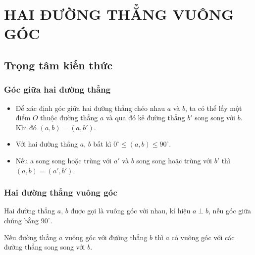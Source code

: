 \setcounter{section}{21}
\setcounter{dang}{0}
\section{HAI ĐƯỜNG THẲNG VUÔNG GÓC}
\subsection{Trọng tâm kiến thức}
\begin{tomtat}
	\subsubsection{Góc giữa hai đường thẳng}
	\begin{boxdn}
	\end{boxdn}
	\begin{note}
	\begin{itemize}
	\item Để xác định góc giữa hai đường thẳng chéo nhau $a$ và $b$, ta có thể lấy một điểm $O$ thuộc đường thẳng $a$ và qua đó kẻ đường thẳng $b'$ song song với $b$. Khi đó $(a, b)=\left(a, b'\right)$.
	\item Với hai đường thẳng $a$, $b$ bất kì $0^{\circ} \leq(a, b) \leq 90^{\circ}$.
	\item Nếu a song song hoặc trùng với $a'$ và $b$ song song hoặc trùng với $b'$ thì $(a, b)=\left(a', b'\right)$.
	\end{itemize}
	\end{note}
	\subsubsection{Hai đường thẳng vuông góc}
	\begin{boxdn}
	Hai đường thẳng $a$, $b$ được gọi là vuông góc với nhau, kí hiệu $a \perp b$, nếu góc giữa chúng bằng $90^{\circ}$.
	\end{boxdn}
	\begin{note}
	Nếu đường thẳng $a$ vuông góc với đường thẳng $b$ thì $a$ có vuông góc với các đường thẳng song song với $b$.
	\end{note}
\end{tomtat}
